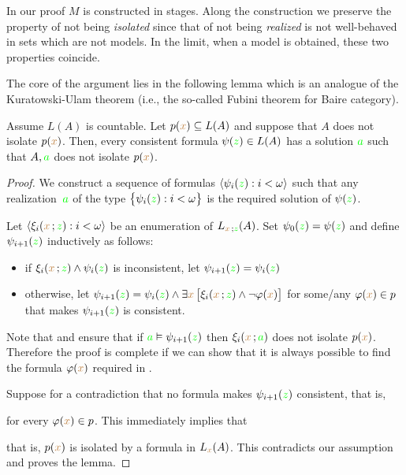 In our proof $M$ is constructed in stages.
Along the construction we preserve the property of not being {\em isolated\/}  since that of not being {\em realized\/} is not well-behaved in sets which are not models.
In the limit, when a model is obtained, these two properties coincide.

The core of the argument lies in the following lemma which is an analogue of the Kura\-towski-Ulam theorem (i.e., the so-called Fubini theorem for Baire category).

\begin{lemma}\label{lem_kuratowskiUlam}
Assume $L(A)$ is countable.
Let $p({\color{brown} x})\subseteq L(A)$ and suppose that $A$ does not isolate $p({\color{brown} x})$.
Then, every consistent formula $\psi({\color{green} z})\in L(A)$ has a solution ${\color{green} a}$ such that $A,{\color{green} a}$ does not isolate $p({\color{brown} x})$.
\end{lemma}
\begin{proof}
We construct a sequence of formulas $\langle\psi_i({\color{green} z}):i<\omega\rangle$ such that any realization~${\color{green} a}$ of the type $\big\{\psi_i({\color{green} z}):i<\omega\big\}$ is the required solution of $\psi({\color{green} z})$.

Let $\langle\xi_i({\color{brown} x}\,;{\color{green} z}):i<\omega\rangle$ be an enumeration of $L_{{\color{brown} x}\,;{\color{green} z}}(A)$.
Set $\psi_0({\color{green} z})= \psi({\color{green} z})$ and define $\psi_{i+1}({\color{green} z})$ inductively as follows:
\begin{itemize}
   \item[1.] if $\xi_i({\color{brown} x}\,;{\color{green} z})\wedge\psi_i({\color{green} z})$ is inconsistent, let $\psi_{i+1}({\color{green} z})=\psi_i({\color{green} z})$
   \item[2.] otherwise, let $\displaystyle\psi_{i+1}({\color{green} z})=\psi_i({\color{green} z}) \wedge \exists{\color{brown}x}\,\big[\xi_i({\color{brown} x}\,;{\color{green} z})\wedge\neg\varphi({\color{brown} x})\big]$ for some/any $\varphi({\color{brown} x})\in p$ that makes $\psi_{i+1}({\color{green} z})$ is consistent.
\end{itemize}
Note that  and  ensure that if ${\color{green} a}\vDash\psi_{i+1}({\color{green} z})$ then $\xi_i({\color{brown} x}\,;{\color{green} a})$ does not isolate $p({\color{brown} x})$.
Therefore the proof is complete if we can show that it is always possible to find the formula $\varphi({\color{brown} x})$ required in .

Suppose for a contradiction that no formula makes $\psi_{i+1}({\color{green} z})$ consistent, that is, 


for every $\varphi({\color{brown} x})\in p$.
This immediately implies that 


that is, $p({\color{brown} x})$ is isolated by a formula in $L_{{\color{brown} x}}(A)$.
This contradicts our assumption and proves the lemma.
\end{proof}

